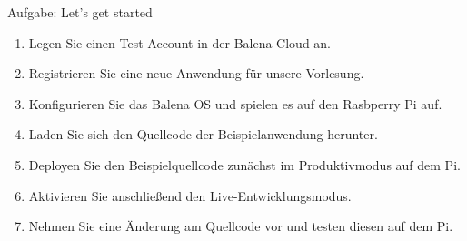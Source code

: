 {
\small

\begin{frame}{Aufgabe: Let's get started}
    \begin{enumerate}
        \item Legen Sie einen Test Account in der Balena Cloud an.
        \item Registrieren Sie eine neue Anwendung für unsere Vorlesung.
        \item Konfigurieren Sie das Balena OS und spielen es auf den Rasbperry Pi auf.
        \item Laden Sie sich den Quellcode der Beispielanwendung herunter.
        \item Deployen Sie den Beispielquellcode zunächst im Produktivmodus auf dem Pi.
        \item Aktivieren Sie anschließend den Live-Entwicklungsmodus.
        \item Nehmen Sie eine Änderung am Quellcode vor und testen diesen auf dem Pi.
    \end{enumerate}
\end{frame}
}

